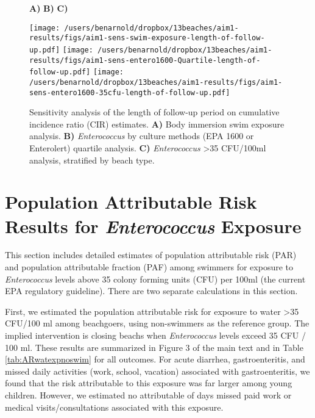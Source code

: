 \documentclass[12pt]{article}\usepackage[]{graphicx}\usepackage[]{color}
\begin{document}
\begin{landscape}
\begin{figure}[htbp]
{\large \hspace{1cm} \textbf{A)} \hspace{7cm} \textbf{B)}    \hspace{7cm} \textbf{C)} }\\

\begin{center}
 \texttt{[image: /users/benarnold/dropbox/13beaches/aim1-results/figs/aim1-sens-swim-exposure-length-of-follow-up.pdf]} 
 \texttt{[image: /users/benarnold/dropbox/13beaches/aim1-results/figs/aim1-sens-entero1600-Quartile-length-of-follow-up.pdf]} 
  \texttt{[image: /users/benarnold/dropbox/13beaches/aim1-results/figs/aim1-sens-entero1600-35cfu-length-of-follow-up.pdf]} 

\begin{minipage}{1.2\textwidth}

\caption{Sensitivity analysis of the length of follow-up period on cumulative incidence ratio (CIR) estimates. \textbf{A)} Body immersion swim exposure analysis. \textbf{B)} \textit{Enterococcus} by culture methods (EPA 1600 or Enterolert) quartile analysis. \textbf{C)} \textit{Enterococcus} >35 CFU/100ml analysis, stratified by beach type. \label{fig:fulengthsens} }
\end{minipage}
\end{center}
\end{figure}
\end{landscape}

\clearpage
\section{Population Attributable Risk Results for \textit{Enterococcus} Exposure}

This section includes detailed estimates of population attributable risk (PAR) and population attributable fraction (PAF) among swimmers for exposure to \textit{Enterococcus} levels above 35 colony forming units (CFU) per 100ml (the current EPA regulatory guideline). There are two separate calculations in this section. 

First, we estimated the population attributable risk for exposure to water >35 CFU/100 ml among beachgoers, using non-swimmers as the reference group. The implied intervention is closing beachs when \textit{Enterococcus} levels exceed 35 CFU / 100 ml.  These results are summarized in Figure 3 of the main text and in Table \ref{tab:ARwatexpnoswim} for all outcomes. For acute diarrhea, gastroenteritis, and missed daily activities (work, school, vacation) associated with gastroenteritis, we found that the risk attributable to this exposure was far larger among young children. However, we estimated no attributable of days missed paid work or medical visits/consultations associated with this exposure.
\end{document}
